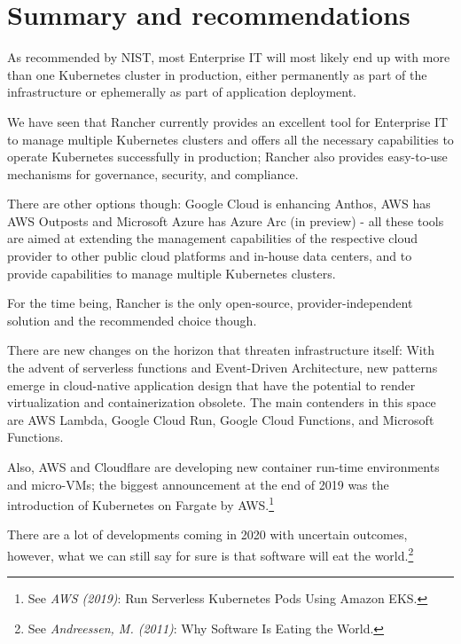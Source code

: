 %
%

\pagebreak
\section{Summary and recommendations}

\onehalfspacing

As recommended by NIST, most Enterprise IT will most likely end up with more than one Kubernetes cluster in production, either permanently as part of the infrastructure or ephemerally as part of application deployment.

We have seen that Rancher currently provides an excellent tool for Enterprise IT to manage multiple Kubernetes clusters and offers all the necessary capabilities to operate Kubernetes successfully in production; Rancher also provides easy-to-use mechanisms for governance, security, and compliance.

There are other options though: Google Cloud is enhancing Anthos, AWS has AWS Outposts and Microsoft Azure has Azure Arc (in preview) - all these tools are aimed at extending the management capabilities of the respective cloud provider to other public cloud platforms and in-house data centers, and to provide capabilities to manage multiple Kubernetes clusters.

For the time being, Rancher is the only open-source, provider-independent solution and the recommended choice though.

There are new changes on the horizon that threaten infrastructure itself: With the advent of serverless functions and Event-Driven Architecture, new patterns emerge in cloud-native application design that have the potential to render virtualization and containerization obsolete. The main contenders in this space are AWS Lambda, Google Cloud Run, Google Cloud Functions, and Microsoft Functions.

Also, AWS and Cloudflare are developing new container run-time environments and micro-VMs; the biggest announcement at the end of 2019 was the introduction of Kubernetes on Fargate by AWS.\footnote{See \textit{AWS (2019)}: Run Serverless Kubernetes Pods Using Amazon EKS.\cite{eksFargate}}

There are a lot of developments coming in 2020 with uncertain outcomes, however, what we can still say for sure is that software will eat the world.\footnote{See \textit{Andreessen, M. (2011)}: Why Software Is Eating the World.\cite{softwareEats}}
